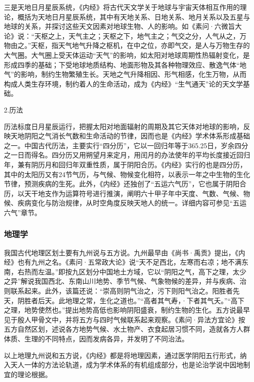 \documentclass[draft,12pt]{ctexbook}
\begin{document}
三是天地日月星辰系统，《内经》将古代天文学关于地球与宇宙天体相互作用的理论，概括为天地日月星辰系统，其中有天地关系、日地关系、地月关系以及五星与地球的关系，并探讨这些天文因素对地球生物、人的影响。如《素问·六微旨大论》说：“天枢之上，天气主之；天枢之下，地气主之；气交之分，人气从之，万物由之。”天枢，指天气地气升降之枢机，在中之位，亦即气交，是人与万物生存的大气圈。大气圈上受天体运动“天气”的影响，如太阳对地球周期性热辐射变化，是形成四季的基础；下受地球地质结构、地面形物及其各种物理效应、散逸气体“地气”的影响，制约生物繁殖生长。天地之气升降相因、形气相感，化生万物，从而构成人类生存环境，制约着人的生命活动，成为《内经》“生气通天”论的天文学基础。

2.历法

历法标度日月星辰运行，把握太阳对地面辐射的周期及其它天体对地球的影响，反映天地阴阳之气消长气数和生命活动的节律，因而也是《内经》学术体系形成基础之一。中国古代历法，主要实行“四分历”，它以一回归年等于365.25日，岁余四分之一日而得名。四分历又用朔望月来定月，用闰月的办法使年的平均长度接近回归年，兼有阴历月和回归年双重性质，属于阴阳合历。《内经》实行的也是四分历，其中的太阳历又有24节气历，与气候、物候变化相符，以表示一年之中生物的生化节律，预测疾病的生死。此外，《内经》还独创了“五运六气历”，它也属于阴阳合历，以天干地支作为运算符号进行推演，阐明六十甲子年中天度、气数、气候、物候、疾病变化与防治规律，从时空角度反映天地人的统一。详细内容可参见“五运六气”章节。

\subsubsection{地理学}%

我国古代地理区划土要有九州说与五方说。九州最早由《尚书·禹贡》提出，《内经》也有九州之名。《素问·五常政大论》说“天不足西北，左寒而右凉；地不满东南，右热而左温。”即按九区划分中国地土方域，它以“阴阳之气，高下之理，太少之异”解说我国西北、东南山川地势、季节气候、气象物候的差异，并与疾病、治则联系起来。此外，该篇还说：“崇高则阴气治之，污下则阳气治之。阳胜者先天，阴胜者后天。此地理之常，生化之道也。”“高者其气寿，·下者其气夭。”“高下之理，地势使然也。”提出地势高低也影响阴阳盛衰，制约生物的生化。五方说最早见于殷人甲骨文中，并将五方与四时气候联系起来观察。《素问·异法方宜论》按五方自然区划，述说各方地势气候、水土物产、衣食起居习惯不同，造就各方人群体质、生理的不同特点，因而发病各异，并发明了不同治法。

以上地理九州说和五方说，《内经》都是将地理因素，通过医学阴阳五行形式，纳入天人一体的方法论轨道，成为学术体系的有机组成部分，也是论治学说中因地制宜的理论根据。
\end{document}
